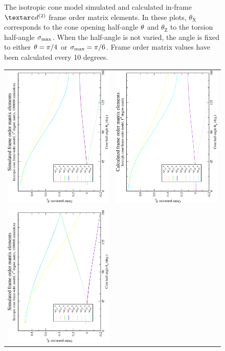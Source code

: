 \begin{figure}
\begin{tabular}{@{}cc@{}}
  \end{tabular}
  \caption[Isotropic cone simulated and calculated in-frame $\FOtwo$ elements.]{
    The isotropic cone model simulated and calculated in-frame $\FOtwo$ frame order matrix elements.
    In these plots, $\theta_\textrm{X}$ corresponds to the cone opening half-angle $\theta$ and $\theta_\textrm{Z}$ to the torsion half-angle $\sigma_\textrm{max}$.
    When the half-angle is not varied, the angle is fixed to either $\theta = \pi/4$ or $\sigma_\textrm{max} = \pi/6$.
    Frame order matrix values have been calculated every 10 degrees.
  }
  \label{fig: simulated and calculated in-frame 2nd degree iso cone frame order}
\end{figure}

\begin{figure}
\centering
  \begin{tabular}{@{}cc@{}}
    \includegraphics[width=.35\textwidth,angle=270]{images/frame_order_matrix/Sij_iso_cone_out_of_frame_theta_x_ens1000000.eps} &
    \includegraphics[width=.35\textwidth,angle=270]{images/frame_order_matrix/Sij_iso_cone_out_of_frame_theta_x_calc.eps} \\
    \\[-5pt]
    \includegraphics[width=.35\textwidth,angle=270]{images/frame_order_matrix/Sij_iso_cone_out_of_frame_theta_z_ens1000000.eps} &

\end{tabular}
\end{figure}
